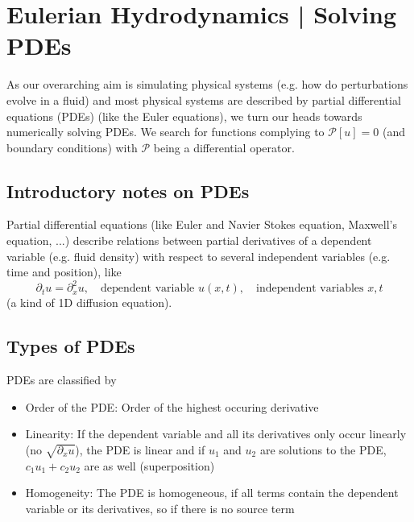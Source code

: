 \section{Eulerian Hydrodynamics | Solving PDEs}
\thispagestyle{plain}

As our overarching aim is simulating physical systems (e.g. how do perturbations
evolve in a fluid) and most physical systems are described by partial differential
equations (PDEs) (like the Euler equations), we turn our heads towards numerically solving
PDEs. We search for functions complying to $\mathcal{P}[u] = 0$ (and boundary conditions) with $\mathcal{P}$ being
a differential operator.


\subsection{Introductory notes on PDEs}
Partial differential equations (like Euler and Navier Stokes equation, Maxwell's equation, ...) describe
relations between partial derivatives of a dependent variable (e.g. fluid density) with respect to
several independent variables (e.g. time and position), like
\begin{equation}
    \partial_t u = \partial_x^2u, \quad \text{dependent variable } u(x,t), \quad \text{independent variables } x,t
\end{equation}
(a kind of 1D diffusion equation).

\subsection{Types of PDEs}
PDEs are classified by
\begin{itemize}
    \item \textcolor{blue1}{Order of the PDE:} Order of the highest occuring derivative
    \item \textcolor{blue1}{Linearity:} If the dependent variable and all its derivatives only occur linearly (no $\sqrt{\partial_x u}$), the PDE is linear and if $u_1$ and $u_2$ are solutions to the PDE, $c_1u_1+c_2u_2$ are as well (\textcolor{blue1}{superposition})
    \item \textcolor{blue1}{Homogeneity:} The PDE is homogeneous, if all terms contain the dependent variable or its derivatives, so if there is no source term
\end{itemize}

